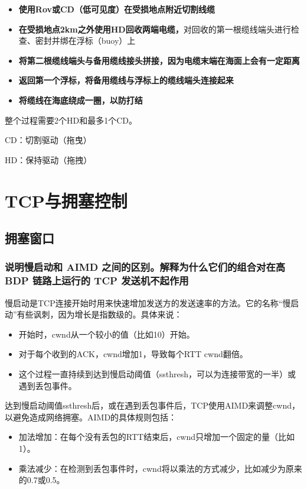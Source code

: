 \begin{itemize}
	\item \textbf{使用Rov或CD（低可见度）在受损地点附近切割线缆}
	\item \textbf{在受损地点2km之外使用HD回收两端电缆，}对回收的第一根缆线端头进行检查、密封并绑在浮标（buoy）上
	\item \textbf{将第二根缆线端头与备用缆线接头拼接，因为电缆末端在海面上会有一定距离}
	\item \textbf{返回第一个浮标，将备用缆线与浮标上的缆线端头连接起来}
    \item \textbf{将缆线在海底绕成一圈，以防打结}
\end{itemize}

整个过程需要2个HD和最多1个CD。

CD：切割驱动（拖曳）

HD：保持驱动（拖拽）

\chapter{TCP与拥塞控制}

\section{拥塞窗口}

\subsection{说明慢启动和 AIMD 之间的区别。解释为什么它们的组合对在高 BDP 链路上运行的 TCP 发送机不起作用}

慢启动是TCP连接开始时用来快速增加发送方的发送速率的方法。它的名称“慢启动”有些讽刺，因为增长是指数级的。具体来说：

\begin{itemize}
	\item 开始时，cwnd从一个较小的值（比如10）开始。
	\item 对于每个收到的ACK，cwnd增加1，导致每个RTT cwnd翻倍。
	\item 这个过程一直持续到达到慢启动阈值（ssthresh，可以为连接带宽的一半）或遇到丢包事件。
\end{itemize}

达到慢启动阈值ssthresh后，或在遇到丢包事件后，TCP使用AIMD来调整cwnd，以避免造成网络拥塞。AIMD的具体规则包括：

\begin{itemize}
	\item 加法增加：在每个没有丢包的RTT结束后，cwnd只增加一个固定的量（比如1）。

	\item 乘法减少：在检测到丢包事件时，cwnd将以乘法的方式减少，比如减少为原来的0.7或0.5。
\end{itemize}


